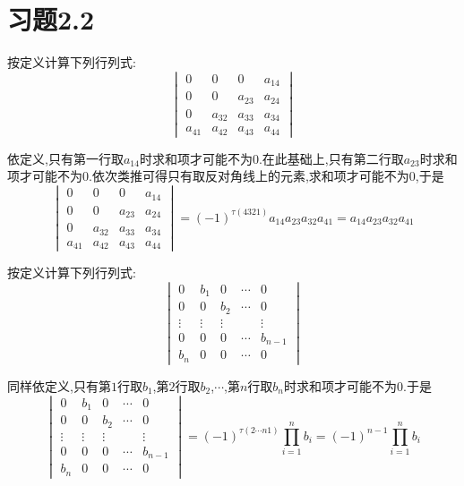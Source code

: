 \documentclass{ctexart}
\begin{document}
\section*{习题2.2}
\begin{homework}[1(1)]
    按定义计算下列行列式:
    \[\begin{vmatrix}
        0&0&0&a_{14}\\
        0&0&a_{23}&a_{24}\\
        0&a_{32}&a_{33}&a_{34}\\
        a_{41}&a_{42}&a_{43}&a_{44}
    \end{vmatrix}\]
\end{homework}
\begin{solution}
    依定义,只有第一行取$a_{14}$时求和项才可能不为$0$.在此基础上,只有第二行取$a_{23}$时求和项才可能不为$0$.依次类推可得只有取反对角线上的元素,求和项才可能不为$0$,于是
    \[\begin{vmatrix}
        0&0&0&a_{14}\\
        0&0&a_{23}&a_{24}\\
        0&a_{32}&a_{33}&a_{34}\\
        a_{41}&a_{42}&a_{43}&a_{44}
    \end{vmatrix}=(-1)^{\tau(4321)}a_{14}a_{23}a_{32}a_{41}=a_{14}a_{23}a_{32}a_{41}\]
\end{solution}
\begin{homework}[1(3)]
    按定义计算下列行列式:
    \[\begin{vmatrix}
        0&b_1&0&\cdots&0\\
        0&0&b_2&\cdots&0\\
        \vdots&\vdots&\vdots& &\vdots\\
        0&0&0&\cdots&b_{n-1}\\
        b_n&0&0&\cdots&0
    \end{vmatrix}\]
\end{homework}
\begin{solution}
    同样依定义,只有第$1$行取$b_1$,第$2$行取$b_2$,$\cdots$,第$n$行取$b_n$时求和项才可能不为$0$.于是
    \[\begin{vmatrix}
        0&b_1&0&\cdots&0\\
        0&0&b_2&\cdots&0\\
        \vdots&\vdots&\vdots& &\vdots\\
        0&0&0&\cdots&b_{n-1}\\
        b_n&0&0&\cdots&0
    \end{vmatrix}=(-1)^{\tau(2\cdots n1)}\prod_{i=1}^{n}b_i=(-1)^{n-1}\prod_{i=1}^{n}b_i\]
\end{solution}
\end{document}

